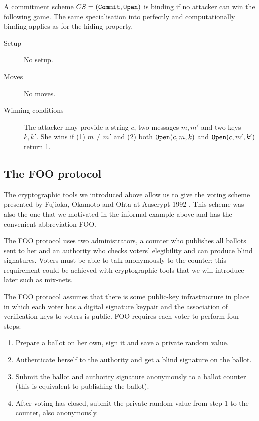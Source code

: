 \documentclass{llncs}
\newcommand{\alg}[1]{\textup{\texttt{#1}}}
\begin{document}
\begin{definition}
A commitment scheme $CS = (\alg{Commit}, \alg{Open})$ is binding if no attacker
can win the following game. The same specialisation into perfectly and
computationally binding applies as for the hiding property.

\begin{description}
\item[Setup]
No setup.

\item[Moves]
No moves.

\item[Winning conditions]
The attacker may provide a string $c$, two messages $m, m'$ and two keys
$k, k'$. She wins if (1) $m \neq m'$ and (2) both $\alg{Open}(c, m, k)$ and
$\alg{Open}(c, m', k')$ return 1.
\end{description}
\end{definition}

\subsection{The FOO protocol}

The cryptographic tools we introduced above allow us to give the voting scheme
presented by Fujioka, Okamoto and Ohta at Auscrypt 1992 \cite{FOO92}. This
scheme was also the one that we motivated in the informal example above and has
the convenient abbreviation FOO.

The FOO protocol uses two administrators, a counter who publishes all ballots
sent to her and an authority who checks voters' elegibility and can produce
blind signatures. Voters must be able to talk anonymously to the counter; this
requirement could be achieved with cryptographic tools that we will introduce
later such as mix-nets.

The FOO protocol assumes that there is some public-key infrastructure in place
in which each voter has a digital signature keypair and the association of
verification keys to voters is public. FOO requires each voter to perform four
steps:
\begin{enumerate}
\item Prepare a ballot on her own, sign it and save a private random value.
\item Authenticate herself to the authority and get a blind signature on the ballot.
\item Submit the ballot and authority signature anonymously to a ballot counter (this is equivalent to publishing the ballot).
\item After voting has closed, submit the private random value from step 1 to the counter, also anonymously.
\end{enumerate}
\end{document}
